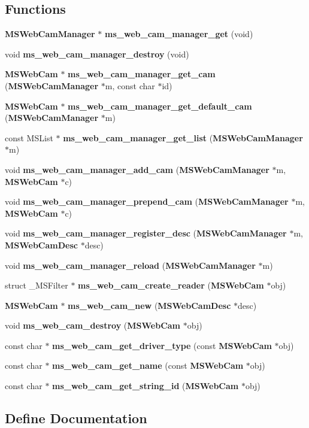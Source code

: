 \subsection*{Functions}
\begin{DoxyCompactItemize}
\item 
{\bf MSWebCamManager} $\ast$ {\bf ms\_\-web\_\-cam\_\-manager\_\-get} (void)
\item 
void {\bf ms\_\-web\_\-cam\_\-manager\_\-destroy} (void)
\item 
{\bf MSWebCam} $\ast$ {\bf ms\_\-web\_\-cam\_\-manager\_\-get\_\-cam} ({\bf MSWebCamManager} $\ast$m, const char $\ast$id)
\item 
{\bf MSWebCam} $\ast$ {\bf ms\_\-web\_\-cam\_\-manager\_\-get\_\-default\_\-cam} ({\bf MSWebCamManager} $\ast$m)
\item 
const MSList $\ast$ {\bf ms\_\-web\_\-cam\_\-manager\_\-get\_\-list} ({\bf MSWebCamManager} $\ast$m)
\item 
void {\bf ms\_\-web\_\-cam\_\-manager\_\-add\_\-cam} ({\bf MSWebCamManager} $\ast$m, {\bf MSWebCam} $\ast$c)
\item 
void {\bf ms\_\-web\_\-cam\_\-manager\_\-prepend\_\-cam} ({\bf MSWebCamManager} $\ast$m, {\bf MSWebCam} $\ast$c)
\item 
void {\bf ms\_\-web\_\-cam\_\-manager\_\-register\_\-desc} ({\bf MSWebCamManager} $\ast$m, {\bf MSWebCamDesc} $\ast$desc)
\item 
void {\bf ms\_\-web\_\-cam\_\-manager\_\-reload} ({\bf MSWebCamManager} $\ast$m)
\item 
struct \_\-MSFilter $\ast$ {\bf ms\_\-web\_\-cam\_\-create\_\-reader} ({\bf MSWebCam} $\ast$obj)
\item 
{\bf MSWebCam} $\ast$ {\bf ms\_\-web\_\-cam\_\-new} ({\bf MSWebCamDesc} $\ast$desc)
\item 
void {\bf ms\_\-web\_\-cam\_\-destroy} ({\bf MSWebCam} $\ast$obj)
\item 
const char $\ast$ {\bf ms\_\-web\_\-cam\_\-get\_\-driver\_\-type} (const {\bf MSWebCam} $\ast$obj)
\item 
const char $\ast$ {\bf ms\_\-web\_\-cam\_\-get\_\-name} (const {\bf MSWebCam} $\ast$obj)
\item 
const char $\ast$ {\bf ms\_\-web\_\-cam\_\-get\_\-string\_\-id} ({\bf MSWebCam} $\ast$obj)
\end{DoxyCompactItemize}


\subsection{Define Documentation}
